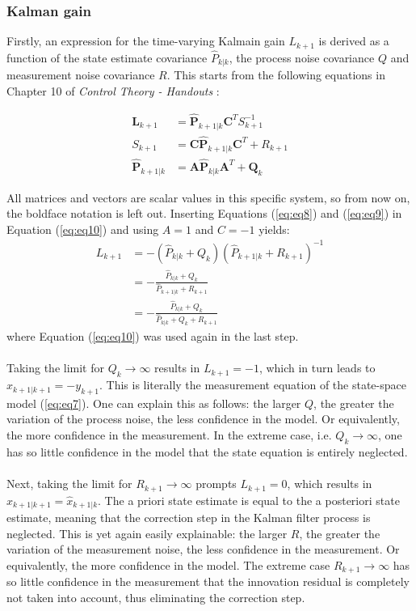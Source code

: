 \documentclass[a4paper,kul]{kulakarticle} %
\begin{document}
\subsubsection*{Kalman gain}

Firstly, an expression for the time-varying Kalmain gain $L_{k+1}$ is derived as a function of the state estimate covariance $\hat{P}_{k|k}$, the process noise covariance $Q$ and measurement noise covariance $R$. This starts from the following equations in Chapter 10 of \textit{Control Theory - Handouts} \cite{slidescontroltheory}:

\begin{align}
	\mathbf{L}_{k+1} &= \mathbf{\hat{P}}_{k+1|k} \mathbf{C}^T S_{k+1}^{-1} \label{eq:eq8}\\
	S_{k+1} &= \mathbf{C \hat{P}}_{k+1|k} \mathbf{C}^T + R_{k+1} \label{eq:eq9}\\
	\mathbf{\hat{P}}_{k+1|k} &= \mathbf{A} \mathbf{\hat{P}}_{k|k} \mathbf{A}^T + \mathbf{Q}_k \label{eq:eq10}
\end{align}

\noindent All matrices and vectors are scalar values in this specific system, so from now on, the boldface notation is left out. Inserting Equations (\ref{eq:eq8}) and (\ref{eq:eq9}) in Equation (\ref{eq:eq10}) and using $A = 1$ and $C = -1$ yields:
\begin{equation}
	\begin{split}
	L_{k+1} &= -\left( \hat{P}_{k|k} + Q_k \right) \left( \hat{P}_{k+1|k} + R_{k+1} \right)^{-1} \\
	&= - \frac{\hat{P}_{k|k} + Q_k}{\hat{P}_{k+1|k} + R_{k+1}} \\
	&= - \frac{\hat{P}_{k|k} + Q_k}{\hat{P}_{k|k} + Q_k + R_{k+1}}
	\end{split}
	\label{eq:eq11}
\end{equation}
where Equation (\ref{eq:eq10}) was used again in the last step.
\\\\
Taking the limit for $Q_k \rightarrow \infty$ results in $L_{k+1} = -1$, which in turn leads to $\hat{x}_{k+1|k+1} = -y_{k+1}$. This is literally the measurement equation of the state-space model (\ref{eq:eq7}). One can explain this as follows: the larger $Q$, the greater the variation of the process noise, the less confidence in the model. Or equivalently, the more confidence in the measurement. In the extreme case, i.e. $Q_k \rightarrow \infty$, one has so little confidence in the model that the state equation is entirely neglected. 
\\\\
Next, taking the limit for $R_{k+1} \rightarrow \infty$ prompts $L_{k+1} = 0$, which results in $\hat{x}_{k+1|k+1} = \hat{x}_{k+1|k}$. The a priori state estimate is equal to the a posteriori state estimate, meaning that the correction step in the Kalman filter process is neglected. This is yet again easily explainable: the larger $R$, the greater the variation of the measurement noise, the less confidence in the measurement. Or equivalently, the more confidence in the model. The extreme case $R_{k+1} \rightarrow \infty$ has so little confidence in the measurement that the innovation residual is completely not taken into account, thus eliminating the correction step.
\end{document}
